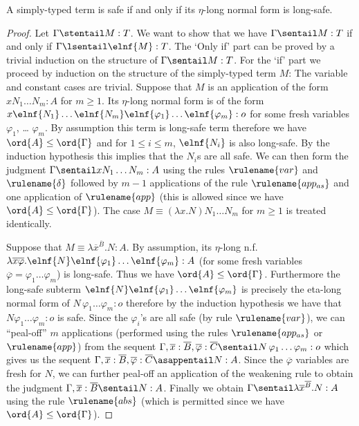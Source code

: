 \begin{lemma}
  \label{lem:safe_iff_etalong_lsafe}
  A simply-typed term is safe if and only if its $\eta$-long normal form is long-safe.
\end{lemma}
\begin{proof}
Let $\Gamma \stentail M : T$. We want to show that we have $\Gamma \sentail M : T$ if and only if $\Gamma \lsentail \elnf{M} : T$. The
`Only if' part can be proved by a trivial induction on the structure of
$\Gamma \sentail M : T$. For the `if' part we proceed by
induction on the structure of the simply-typed term $M$: The variable and constant cases are
trivial. Suppose that $M$ is an application of the form $x N_1
\ldots N_m : A$ for $m\geq 1$. Its $\eta$-long normal form is of the
form $x \elnf{N_1} \ldots \elnf{N_m} \elnf{\varphi_1} \ldots
\elnf{\varphi_m}: o$ for some fresh variables $\varphi_1$, \ldots
$\varphi_m$. By assumption this term is long-safe term therefore we
have $\ord{A}\leq\ord{\Gamma}$ and for $1\leq i \leq m$,
$\elnf{N_i}$ is also long-safe. By the induction hypothesis this
implies that the $N_i$s are all safe. We can then form the judgment
$\Gamma \sentail x N_1 \ldots N_m : A$ using the rules
$\rulename{var}$ and $\rulename{\delta}$ followed by $m-1$
applications of the rule $\rulename{app_{as}}$ and one application
of $\rulename{app}$ (this is allowed since we have
$\ord{A}\leq\ord{\Gamma}$). The case $M\equiv (\lambda x. N) N_1
\ldots N_m$ for $m\geq 1$ is treated identically.

Suppose that $M \equiv \lambda \overline{x}^{\overline B} . N : A$. By assumption,
its  $\eta$-long n.f.\ $\lambda \overline{x} \overline{\varphi} .
\elnf{N} \elnf{\varphi_1} \ldots \elnf{\varphi_m}: A$ (for some
fresh variables $\overline\varphi = \varphi_1 \ldots \varphi_m$) is long-safe. Thus
we have $\ord{A}\leq\ord{\Gamma}$. Furthermore the long-safe subterm
$\elnf{N} \elnf{\varphi_1} \ldots \elnf{\varphi_m}$ is precisely the
eta-long normal form of $N\, \varphi_1 \ldots \varphi_m : o$ therefore by
the induction hypothesis we have that $N \varphi_1 \ldots \varphi_m
:o$ is safe. Since the $\varphi_i$'s are all safe (by rule
$\rulename{var}$), we can ``peal-off'' $m$ applications (performed using
the rules $\rulename{app_{as}}$ or $\rulename{app}$) from the sequent $\Gamma,
\overline{x}:\overline B,
\overline{\varphi}:\overline C \sentail N\, \varphi_1 \ldots
\varphi_m :o$ which gives us the sequent $\Gamma, \overline{x}:\overline B,
\overline{\varphi}:\overline C \asappentail N : A$. Since the $\overline{\varphi}$
variables are fresh for $N$, we can further peal-off an
application of the weakening rule to obtain the judgment $\Gamma,
\overline{x}:\overline B \sentail N : A$. Finally we obtain $\Gamma \sentail
\lambda \overline{x}^{\overline{B}} . N : A$ using the rule $\rulename{abs}$ (which
is permitted since we have $\ord{A}\leq\ord{\Gamma}$).
\end{proof}



